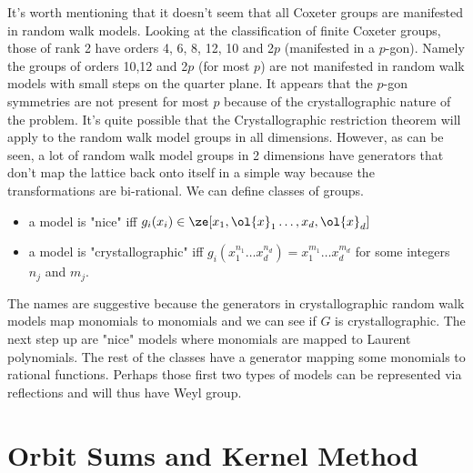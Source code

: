 It's worth mentioning that it doesn't seem that all Coxeter groups are manifested in random walk models. Looking at the classification of finite Coxeter groups, those of rank 2 have orders 4, 6, 8, 12, 10 and 2$p$ (manifested in a $p$-gon). Namely the groups of orders 10,12 and 2$p$ (for most $p$) are not manifested in random walk models with small steps on the quarter plane. It appears that the $p$-gon symmetries are not present for most $p$ because of the crystallographic nature of the problem. It's quite possible that the Crystallographic restriction theorem will apply to the random walk model groups in all dimensions. However, as can be seen, a lot of random walk model groups in 2 dimensions have generators that don't map the lattice back onto itself in a simple way because the transformations are bi-rational. We can define classes of groups.

\begin{itemize}
\item a model is "nice" iff $g_i(x_i) \in \ze[x_1,\ol{x}_1\ldots,x_d,\ol{x}_d]$
\item a model is "crystallographic" iff $g_i(x_1^{n_1}\ldots x_d^{n_d}) = x_1^{m_1}\ldots x_d^{m_d}$ for some integers $n_j$ and $m_j$.
\end{itemize}
The names are suggestive because the generators in crystallographic random walk models map monomials to monomials and we can see if $G$ is crystallographic. The next step up are "nice" models where monomials are mapped to Laurent polynomials. The rest of the classes have a generator mapping some monomials to rational functions. Perhaps those first two types of models can be represented via reflections and will thus have Weyl group.

\section{Orbit Sums and Kernel Method}

